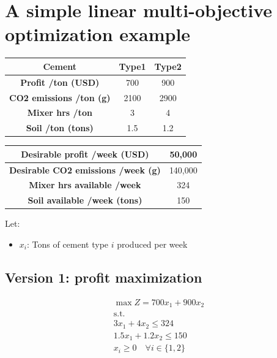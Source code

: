 \documentclass[10pt]{article}
\begin{document}
\section{A simple linear multi-objective optimization example}
\begin{center}
    \begin{tabular}{|c|c|c|}
        \hline 
        \textbf{Cement} & \textbf{Type1} & \textbf{Type2} \\\hline 
        \textbf{Profit /ton (USD)} & 700 & 900\\\hline
        \textbf{CO2 emissions /ton (g)} & 2100 & 2900\\\hline
        \textbf{Mixer hrs /ton} & 3 & 4\\\hline
        \textbf{Soil /ton (tons)} & 1.5 & 1.2\\\hline
    \end{tabular}
\end{center}
\begin{center}
    \begin{tabular}{|c|c|}
        \hline 
        \textbf{Desirable profit /week (USD)} & 50,000 \\\hline 
        \textbf{Desirable CO2 emissions /week (g)} & 140,000 \\\hline 
        \textbf{Mixer hrs available /week} & 324 \\\hline 
        \textbf{Soil available /week (tons)} & 150 \\\hline 
    \end{tabular}
\end{center}
Let: 
\begin{itemize}
    \item $x_i $: Tons of cement type $i $ produced per week
\end{itemize}
\subsection{Version 1: profit maximization}
\begin{gather*}
    \max Z = 700x_1 + 900x_2\\
    \text{s.t.}\\
    3x_1 + 4x_2 \le 324\\
    1.5x_1 + 1.2x_2 \le 150\\
    x_i \ge 0 \quad\forall i \in \{1, 2\}
\end{gather*}
\end{document}

